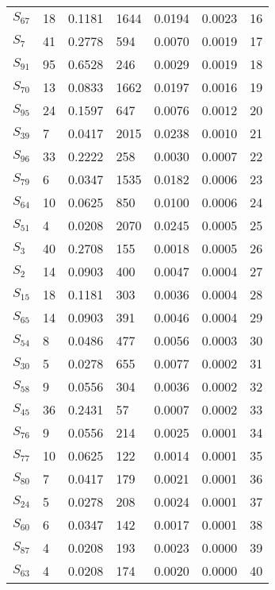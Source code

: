 \begin{xltabular}{\textwidth}{XPPPPPP}
  $S_{67}$ & 18 & 0.1181 & 1644 & 0.0194 & 0.0023 & 16 \\ 
  $S_{7}$ & 41 & 0.2778 & 594 & 0.0070 & 0.0019 & 17 \\ 
  $S_{91}$ & 95 & 0.6528 & 246 & 0.0029 & 0.0019 & 18 \\ 
  $S_{70}$ & 13 & 0.0833 & 1662 & 0.0197 & 0.0016 & 19 \\ 
  $S_{95}$ & 24 & 0.1597 & 647 & 0.0076 & 0.0012 & 20 \\ 
  $S_{39}$ & 7 & 0.0417 & 2015 & 0.0238 & 0.0010 & 21 \\ 
  $S_{96}$ & 33 & 0.2222 & 258 & 0.0030 & 0.0007 & 22 \\ 
  $S_{79}$ & 6 & 0.0347 & 1535 & 0.0182 & 0.0006 & 23 \\ 
  $S_{64}$ & 10 & 0.0625 & 850 & 0.0100 & 0.0006 & 24 \\ 
  $S_{51}$ & 4 & 0.0208 & 2070 & 0.0245 & 0.0005 & 25 \\ 
  $S_{3}$ & 40 & 0.2708 & 155 & 0.0018 & 0.0005 & 26 \\ 
  $S_{2}$ & 14 & 0.0903 & 400 & 0.0047 & 0.0004 & 27 \\ 
  $S_{15}$ & 18 & 0.1181 & 303 & 0.0036 & 0.0004 & 28 \\ 
  $S_{65}$ & 14 & 0.0903 & 391 & 0.0046 & 0.0004 & 29 \\ 
  $S_{54}$ & 8 & 0.0486 & 477 & 0.0056 & 0.0003 & 30 \\ 
  $S_{30}$ & 5 & 0.0278 & 655 & 0.0077 & 0.0002 & 31 \\ 
  $S_{58}$ & 9 & 0.0556 & 304 & 0.0036 & 0.0002 & 32 \\ 
  $S_{45}$ & 36 & 0.2431 & 57 & 0.0007 & 0.0002 & 33 \\ 
  $S_{76}$ & 9 & 0.0556 & 214 & 0.0025 & 0.0001 & 34 \\ 
  $S_{77}$ & 10 & 0.0625 & 122 & 0.0014 & 0.0001 & 35 \\ 
  $S_{80}$ & 7 & 0.0417 & 179 & 0.0021 & 0.0001 & 36 \\ 
  $S_{24}$ & 5 & 0.0278 & 208 & 0.0024 & 0.0001 & 37 \\ 
  $S_{60}$ & 6 & 0.0347 & 142 & 0.0017 & 0.0001 & 38 \\ 
  $S_{87}$ & 4 & 0.0208 & 193 & 0.0023 & 0.0000 & 39 \\ 
  $S_{63}$ & 4 & 0.0208 & 174 & 0.0020 & 0.0000 & 40 \\ 

\end{xltabular}
